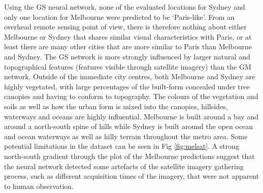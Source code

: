 \documentclass[10pt,letterpaper,hidelinks]{article}
\begin{document}
Using the GS neural network, none of the evaluated locations for Sydney and only one location for Melbourne were predicted to be `Paris-like'. From an overhead remote sensing point of view, there is therefore nothing about either Melbourne or Sydney that shares similar visual characteristics with Paris, or at least there are many other cities that are more similar to Paris than Melbourne and Sydney. The GS network is more strongly influenced by larger natural and topographical features (features visible through satellite imagery) than the GM network. Outside of the immediate city centres, both Melbourne and Sydney are highly vegetated, with large percentages of the built-form concealed under tree canopies and having to conform to topography. The colours of the vegetation and soils as well as how the urban form is mixed into the canopies, hillsides, waterways and oceans are highly influential. Melbourne is built around a bay and around a north-south spine of hills while Sydney is built around the open ocean and ocean waterways as well as hilly terrain throughout the metro area. Some potential limitations in the dataset can be seen in Fig \ref{fig:melsat}. A strong north-south gradient through the plot of the Melbourne predictions suggest that the neural network detected some artefacts of the satellite imagery gathering process, such as different acquisition times of the imagery, that were not apparent to human observation. 
\end{document}
